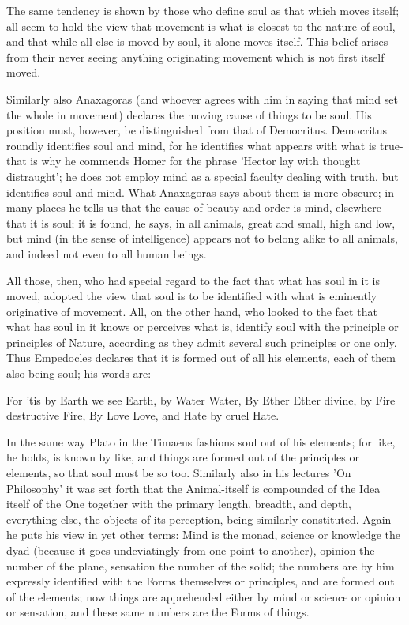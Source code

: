 The same tendency is shown by those who define soul as that which
moves itself; all seem to hold the view that movement is what is closest
to the nature of soul, and that while all else is moved by soul, it
alone moves itself. This belief arises from their never seeing anything
originating movement which is not first itself moved. 

Similarly also Anaxagoras (and whoever agrees with him in saying that
mind set the whole in movement) declares the moving cause of things
to be soul. His position must, however, be distinguished from that
of Democritus. Democritus roundly identifies soul and mind, for he
identifies what appears with what is true-that is why he commends
Homer for the phrase 'Hector lay with thought distraught'; he does
not employ mind as a special faculty dealing with truth, but identifies
soul and mind. What Anaxagoras says about them is more obscure; in
many places he tells us that the cause of beauty and order is mind,
elsewhere that it is soul; it is found, he says, in all animals, great
and small, high and low, but mind (in the sense of intelligence) appears
not to belong alike to all animals, and indeed not even to all human
beings. 

All those, then, who had special regard to the fact that what has
soul in it is moved, adopted the view that soul is to be identified
with what is eminently originative of movement. All, on the other
hand, who looked to the fact that what has soul in it knows or perceives
what is, identify soul with the principle or principles of Nature,
according as they admit several such principles or one only. Thus
Empedocles declares that it is formed out of all his elements, each
of them also being soul; his words are: 

For 'tis by Earth we see Earth, by Water Water, 
By Ether Ether divine, by Fire destructive Fire, 
By Love Love, and Hate by cruel Hate. 

In the same way Plato in the Timaeus fashions soul out of his elements;
for like, he holds, is known by like, and things are formed out of
the principles or elements, so that soul must be so too. Similarly
also in his lectures 'On Philosophy' it was set forth that the Animal-itself
is compounded of the Idea itself of the One together with the primary
length, breadth, and depth, everything else, the objects of its perception,
being similarly constituted. Again he puts his view in yet other terms:
Mind is the monad, science or knowledge the dyad (because it goes
undeviatingly from one point to another), opinion the number of the
plane, sensation the number of the solid; the numbers are by him expressly
identified with the Forms themselves or principles, and are formed
out of the elements; now things are apprehended either by mind or
science or opinion or sensation, and these same numbers are the Forms
of things. 

